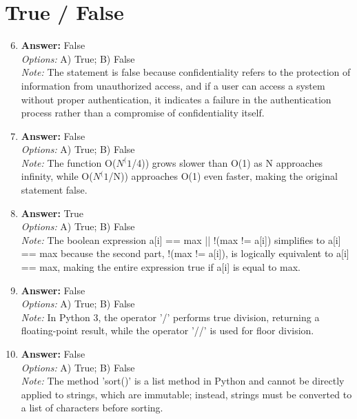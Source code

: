 \documentclass[12pt]{article}
\begin{document}
\section*{True / False}
\begin{enumerate}[label=\arabic*.]
\setcounter{enumi}{5}
\item \textbf{Answer:} False
\\ \textit{Options:} A) True; B) False
\\ \textit{Note:} The statement is false because confidentiality refers to the protection of information from unauthorized access, and if a user can access a system without proper authentication, it indicates a failure in the authentication process rather than a compromise of confidentiality itself.
\item \textbf{Answer:} False
\\ \textit{Options:} A) True; B) False
\\ \textit{Note:} The function O($N^(1$/4)) grows slower than O(1) as N approaches infinity, while O($N^(1$/N)) approaches O(1) even faster, making the original statement false.
\item \textbf{Answer:} True
\\ \textit{Options:} A) True; B) False
\\ \textit{Note:} The boolean expression a[i] == max || !(max != a[i]) simplifies to a[i] == max because the second part, !(max != a[i]), is logically equivalent to a[i] == max, making the entire expression true if a[i] is equal to max.
\item \textbf{Answer:} False
\\ \textit{Options:} A) True; B) False
\\ \textit{Note:} In Python 3, the operator '/' performs true division, returning a floating-point result, while the operator '//' is used for floor division.
\item \textbf{Answer:} False
\\ \textit{Options:} A) True; B) False
\\ \textit{Note:} The method 'sort()' is a list method in Python and cannot be directly applied to strings, which are immutable; instead, strings must be converted to a list of characters before sorting.
\end{enumerate}
\end{document}
